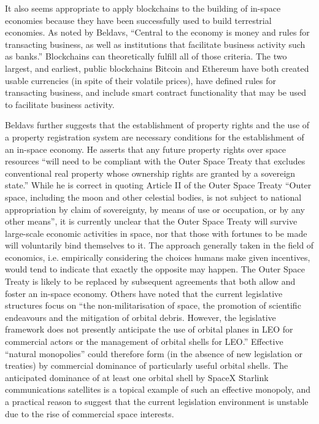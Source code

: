 \documentclass[]{aiaa-tc}%
\begin{document}
It also seems appropriate to apply blockchains to the building of in-space economies because they have been successfully used to build terrestrial economies. As noted by Beldavs, ``Central to the economy is money and rules for transacting business, as well as institutions that facilitate business activity such as banks.''\cite{beldavs_blockchains_2016} Blockchains can theoretically fulfill all of those criteria. The two largest, and earliest, public blockchains Bitcoin\cite{nakamoto_bitcoin_2008} and Ethereum\cite{buterin_ethereum_2013,wood_ethereum_2014} have both created usable currencies (in spite of their volatile prices), have defined rules for transacting business, and include smart contract functionality\cite{szabo_smart_1994} that may be used to facilitate business activity.

Beldavs further suggests that the establishment of property rights and the use of a property registration system are necessary conditions for the establishment of an in-space economy\cite{beldavs_blockchains_2016}. He asserts that any future property rights over space resources ``will need to be compliant with the Outer Space Treaty that excludes conventional real property whose ownership rights are granted by a sovereign state.'' While he is correct in quoting Article II of the Outer Space Treaty\cite{UNCPUOS_1967} ``Outer space, including the moon and other celestial bodies, is not subject to national appropriation by claim of sovereignty, by means of use or occupation, or by any other means'', it is currently unclear that the Outer Space Treaty will survive large-scale economic activities in space, nor that those with fortunes to be made will voluntarily bind themselves to it. The approach generally taken in the field of economics, i.e. empirically considering the choices humans make given incentives, would tend to indicate that exactly the opposite may happen. The Outer Space Treaty is likely to be replaced by subsequent agreements that both allow and foster an in-space economy. Others have noted that the current legislative structures focus on ``the non-militarisation of space, the promotion of scientific endeavours and the mitigation of orbital debris. However, the legislative framework does not presently anticipate the use of orbital planes in LEO for commercial actors or the management of orbital shells for LEO.''\cite{green_mitigation_2018} Effective ``natural monopolies'' could therefore form (in the absence of new legislation or treaties) by commercial dominance of particularly useful orbital shells. The anticipated dominance of at least one orbital shell by SpaceX Starlink communications satellites is a topical example of such an effective monopoly, and a practical reason to suggest that the current legislation environment is unstable due to the rise of commercial space interests.
\end{document}
